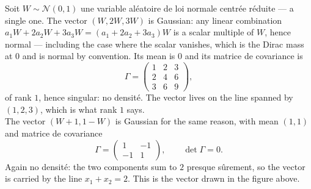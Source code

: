 \begin{example}
Soit $W \sim \mathcal{N}(0,1)$ une variable aléatoire de loi normale centrée
réduite --- a single one. The vector
$(W, 2W, 3W)$ is Gaussian: any linear combination
$a_{1}W + 2a_{2}W + 3a_{3}W = (a_{1}+2a_{2}+3a_{3})W$ is a scalar multiple of
$W$, hence normal --- including the case where the scalar vanishes, which is the
Dirac mass at $0$ and is normal by convention. Its mean is $0$ and its matrice
de covariance is
\[
  \Gamma = \begin{pmatrix} 1 & 2 & 3 \\ 2 & 4 & 6 \\ 3 & 6 & 9 \end{pmatrix} ,
\]
of rank $1$, hence singular: no densité. The vector lives on the line spanned by
$(1,2,3)$, which is what rank $1$ says.\\

The vector $(W+1, 1-W)$ is Gaussian for the same reason, with mean $(1,1)$ and
matrice de covariance
\[
  \Gamma = \begin{pmatrix} 1 & -1 \\ -1 & 1 \end{pmatrix} ,
  \qquad \det\Gamma = 0 .
\]
Again no densité: the two components sum to $2$ presque sûrement, so the vector
is carried by the line $x_{1} + x_{2} = 2$. This is the vector drawn in the
figure above.
\end{example}

